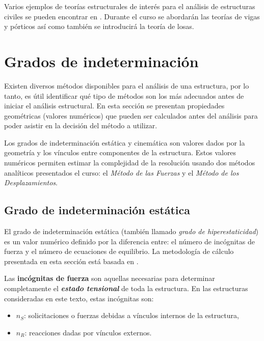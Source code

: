 Varios ejemplos de teorías estructurales de interés para el análisis de estructuras civiles se pueden encontrar en \citep{Onate2013}. %
%
Durante el curso se abordarán las teorías de vigas y pórticos así como también se introducirá la teoría de losas.



\section{Grados de indeterminación}

Existen diversos métodos disponibles para el análisis de una estructura, por lo tanto, es útil identificar qué tipo de métodos son los más adecuados antes de iniciar el análisis estructural. %
En esta sección se presentan propiedades geométricas (valores numéricos) que pueden ser calculados antes del análisis para poder asistir en la decisión del método a utilizar.

Los grados de indeterminación estática y cinemática son valores dados por la geometría y los vínculos entre componentes de la estructura. %
%
Estos valores numéricos permiten estimar la complejidad de la resolución usando dos métodos analíticos presentados el curso: el \textit{Método de las Fuerzas} y el \textit{Método de los Desplazamientos}. %
%


\subsection{Grado de indeterminación estática}

El grado de indeterminación estática (también llamado \textit{grado de hiperestaticidad}) es un valor numérico definido por la diferencia entre: el número de incógnitas de fuerza y el número de ecuaciones de equilibrio. %
%
La metodología de cálculo presentada en esta sección está basada en \citep{CerveraRuiz2002ii}.

Las \textbf{incógnitas de fuerza} son aquellas necesarias para determinar completamente el \textit{\textbf{estado tensional}} de toda la estructura. En las estructuras consideradas en este texto, estas incógnitas son:
%
\begin{itemize}
	\item $n_S$: solicitaciones o fuerzas debidas a vínculos internos de la estructura,
	\item $n_R$: reacciones dadas por vínculos externos.
\end{itemize}


